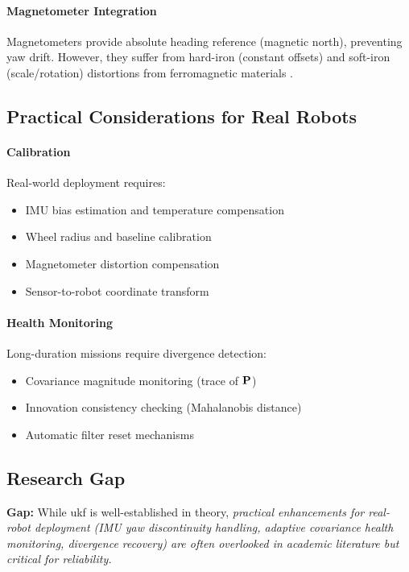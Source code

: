 \paragraph{Magnetometer Integration}
Magnetometers provide absolute heading reference (magnetic north), preventing yaw drift. However, they suffer from hard-iron (constant offsets) and soft-iron (scale/rotation) distortions from ferromagnetic materials \cite{Gebre2013}.

\subsection{Practical Considerations for Real Robots}

\paragraph{Calibration}
Real-world deployment requires:
\begin{itemize}
    \item IMU bias estimation and temperature compensation
    \item Wheel radius and baseline calibration
    \item Magnetometer distortion compensation
    \item Sensor-to-robot coordinate transform
\end{itemize}

\paragraph{Health Monitoring}
Long-duration missions require divergence detection:
\begin{itemize}
    \item Covariance magnitude monitoring (trace of $\mathbf{P}$)
    \item Innovation consistency checking (Mahalanobis distance)
    \item Automatic filter reset mechanisms
\end{itemize}

\subsection{Research Gap}
\textbf{Gap:} While \acrshort{ukf} is well-established in theory, \textit{practical enhancements for real-robot deployment (IMU yaw discontinuity handling, adaptive covariance health monitoring, divergence recovery) are often overlooked in academic literature but critical for reliability.}

